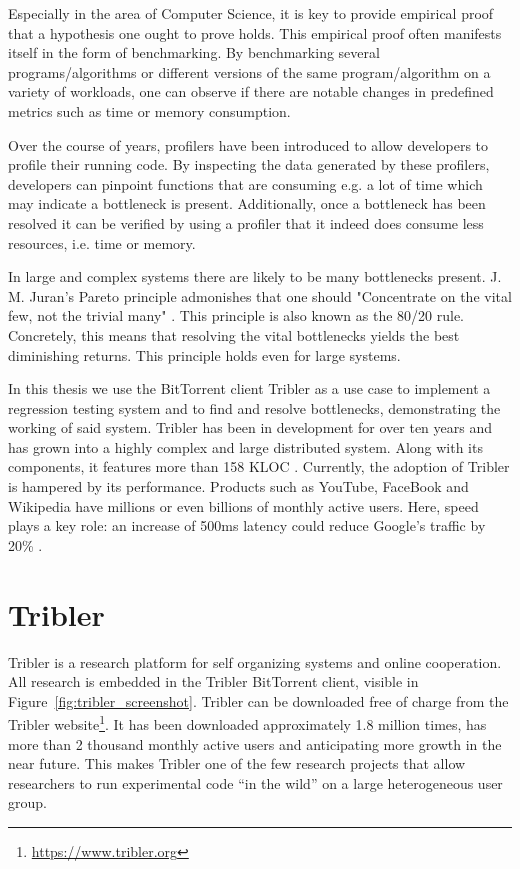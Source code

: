 Especially in the area of Computer Science, it is key to provide empirical proof that a hypothesis one ought to prove holds.
This empirical proof often manifests itself in the form of benchmarking.
By benchmarking several programs/algorithms or different versions of the same program/algorithm on a variety of workloads, one can observe if there are notable changes in predefined metrics such as time or memory consumption.

Over the course of years, profilers have been introduced to allow developers to profile their running code.
By inspecting the data generated by these profilers, developers can pinpoint functions that are consuming e.g. a lot of time which may indicate a bottleneck is present.
Additionally, once a bottleneck has been resolved it can be verified by using a profiler that it indeed does consume less resources, i.e. time or memory.

In large and complex systems there are likely to be many bottlenecks present.
J. M. Juran's Pareto principle admonishes that one should "Concentrate on the vital few, not the trivial many" \cite{ammons2004finding}. This principle is also known as the 80/20 rule.
Concretely, this means that resolving the vital bottlenecks yields the best diminishing returns.
This principle holds even for large systems.

In this thesis we use the BitTorrent client Tribler as a use case to implement a regression testing system and to find and resolve bottlenecks, demonstrating the working of said system.
Tribler has been in development for over ten years and has grown into a highly complex and large distributed system.
Along with its components, it features more than 158 KLOC \cite{tribler2015about}.
Currently, the adoption of Tribler is hampered by its performance. 
Products such as YouTube, FaceBook and Wikipedia have millions or even billions of monthly active users.
Here, speed plays a key role: an increase of 500ms latency could reduce Google's traffic by 20\% \cite{mayer2009search}.

\section{Tribler}

Tribler is a research platform for self organizing systems and online cooperation.
All research is embedded in the Tribler BitTorrent client, visible in Figure~\ref{fig:tribler_screenshot}.
Tribler can be downloaded free of charge from the Tribler website\footnote{\url{https://www.tribler.org}}.
It has been downloaded approximately 1.8 million times, has more than 2 thousand monthly active users and anticipating more growth in the near future.
This makes Tribler one of the few research projects that allow researchers to run experimental code \enquote{in the wild} on a large heterogeneous user group.

